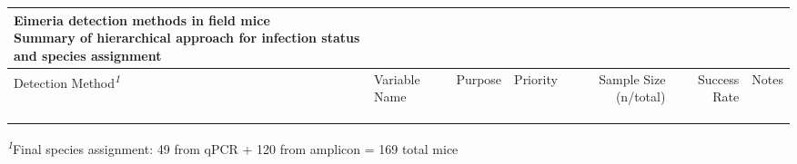 \setlength{\LTpost}{0mm}
\begin{longtable}{llllrrl}
\caption*{
{\large Eimeria detection methods in field mice} \\ 
{\small Summary of hierarchical approach for infection status and species assignment}
} \\ 
\toprule
Detection Method\textsuperscript{\textit{1}} & Variable Name & Purpose & Priority & Sample Size (n/total) & Success Rate & Notes \\ 
\midrule\addlinespace[2.5pt]
\cellcolor[HTML]{F3E5F5}{Caecal qPCR + melting curve} & \cellcolor[HTML]{F3E5F5}{MC.Eimeria} & \cellcolor[HTML]{F3E5F5}{Infection detection (presence/absence)} & \cellcolor[HTML]{F3E5F5}{Primary} & \cellcolor[HTML]{F3E5F5}{185/336} & \cellcolor[HTML]{F3E5F5}{55.1\%} & \cellcolor[HTML]{F3E5F5}{Direct infection status from melting curve} \\ 
\cellcolor[HTML]{F3E5F5}{Caecal qPCR + melting curve} & \cellcolor[HTML]{F3E5F5}{eimeriaSpecies} & \cellcolor[HTML]{F3E5F5}{Species identification} & \cellcolor[HTML]{F3E5F5}{Primary} & \cellcolor[HTML]{F3E5F5}{49/336} & \cellcolor[HTML]{F3E5F5}{14.6\%} & \cellcolor[HTML]{F3E5F5}{Species ID from melting curve patterns} \\ 
\cellcolor[HTML]{FFF3E0}{Amplicon sequencing} & \cellcolor[HTML]{FFF3E0}{amplicon\_species} & \cellcolor[HTML]{FFF3E0}{Backup species identification} & \cellcolor[HTML]{FFF3E0}{Backup} & \cellcolor[HTML]{FFF3E0}{134/336} & \cellcolor[HTML]{FFF3E0}{39.9\%} & \cellcolor[HTML]{FFF3E0}{Used when qPCR species ID unavailable} \\ 
\bottomrule
\end{longtable}
\begin{minipage}{\linewidth}
\textsuperscript{\textit{1}}Final species assignment: 49 from qPCR + 120 from amplicon = 169 total mice\\
\end{minipage}

